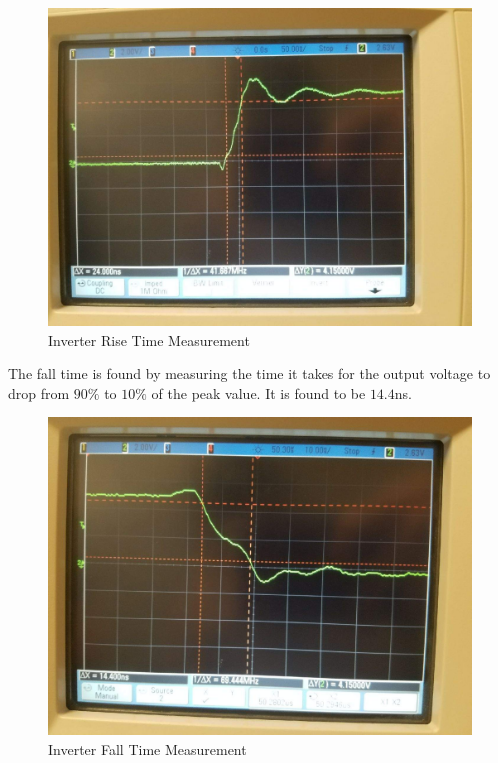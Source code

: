 \FloatBarrier
\begin{figure}[h!]
	\centering
	\includegraphics[scale=0.25]{../images/inverter_tr.jpeg}
	\caption{Inverter Rise Time Measurement}
	\label{fig:inverter_rise_time}
\end{figure}
\FloatBarrier

The fall time is found by measuring the time it takes for the output voltage to drop from $90\%$ to $10\%$ of the peak value. It is found to be $14.4$\si{\nano\second}.

\FloatBarrier
\begin{figure}[h!]
	\centering
	\includegraphics[scale=0.25]{../images/inverter_tf.jpeg}
	\caption{Inverter Fall Time Measurement}
	\label{fig:inverter_fall_time}
\end{figure}
\FloatBarrier

